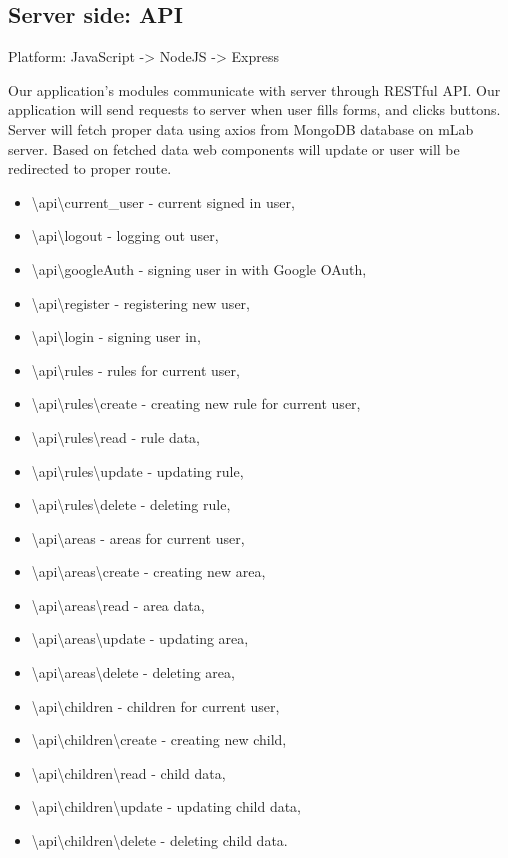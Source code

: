 \documentclass{sprawozdanie-agh}
\begin{document}
		\subsection{Server side: API}

			Platform: JavaScript -> NodeJS -> Express

			Our application's modules communicate with server through RESTful API. Our application will send requests to server when user fills forms, and clicks buttons. Server will fetch proper data using axios from MongoDB database on mLab server. Based on fetched data web components will update or user will be redirected to proper route.
			
			\begin{itemize}
				\item \textbackslash api\textbackslash current\_user - current signed in user,
				\item \textbackslash api\textbackslash logout - logging out user,
				\item \textbackslash api\textbackslash googleAuth - signing user in with Google OAuth,
				\item \textbackslash api\textbackslash register - registering new user,
				\item \textbackslash api\textbackslash login - signing user in,
				\item \textbackslash api\textbackslash rules - rules for current user,
				\item \textbackslash api\textbackslash rules\textbackslash create - creating new rule for current user,
				\item \textbackslash api\textbackslash rules\textbackslash read - rule data,
				\item \textbackslash api\textbackslash rules\textbackslash update - updating rule,
				\item \textbackslash api\textbackslash rules\textbackslash delete - deleting rule,
				\item \textbackslash api\textbackslash areas - areas for current user,
				\item \textbackslash api\textbackslash areas\textbackslash create - creating new area,
				\item \textbackslash api\textbackslash areas\textbackslash read - area data,
				\item \textbackslash api\textbackslash areas\textbackslash update - updating area,
				\item \textbackslash api\textbackslash areas\textbackslash delete - deleting area,	
				\item \textbackslash api\textbackslash children - children for current user,
				\item \textbackslash api\textbackslash children\textbackslash create - creating new child,
				\item \textbackslash api\textbackslash children\textbackslash read - child data,
				\item \textbackslash api\textbackslash children\textbackslash update - updating child data,
				\item \textbackslash api\textbackslash children\textbackslash delete - deleting child data.
			\end{itemize}
		
\end{document}
